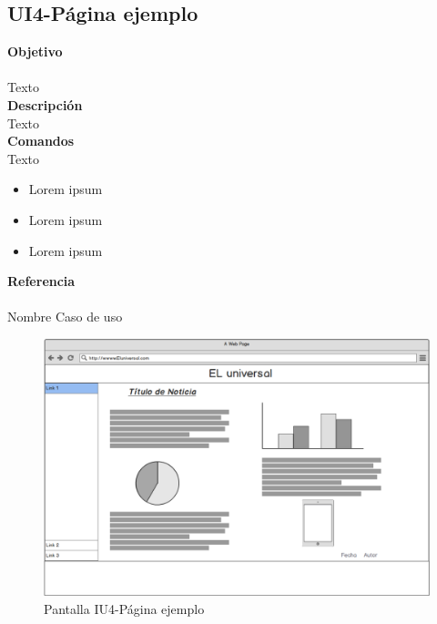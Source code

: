 \subsection{UI4-Página ejemplo}

\Large{\textbf{Objetivo}}\\\\
\normalsize{Texto}\\



\Large{\textbf{Descripción}}\\
\normalsize{Texto}\\


\Large{\textbf{Comandos}}\\
\normalsize{Texto}

\begin{itemize}
	\item Lorem ipsum
	\item Lorem ipsum
	\item Lorem ipsum
\end{itemize}

\Large{\textbf{Referencia}}\\\\
\normalsize{Nombre Caso de uso}

\begin{figure}[h]
  \centering
	\includegraphics[scale=.3]{imagenes/Pantallas/UI4}
  \caption{Pantalla IU4-Página ejemplo}
  \label{fig:IU4}
\end{figure}